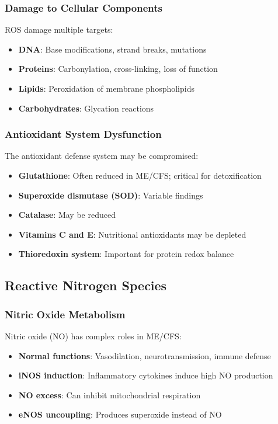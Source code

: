 \subsubsection{Damage to Cellular Components}

ROS damage multiple targets:

\begin{itemize}
    \item \textbf{DNA}: Base modifications, strand breaks, mutations
    \item \textbf{Proteins}: Carbonylation, cross-linking, loss of function
    \item \textbf{Lipids}: Peroxidation of membrane phospholipids
    \item \textbf{Carbohydrates}: Glycation reactions
\end{itemize}

\subsubsection{Antioxidant System Dysfunction}

The antioxidant defense system may be compromised:

\begin{itemize}
    \item \textbf{Glutathione}: Often reduced in ME/CFS; critical for detoxification
    \item \textbf{Superoxide dismutase (SOD)}: Variable findings
    \item \textbf{Catalase}: May be reduced
    \item \textbf{Vitamins C and E}: Nutritional antioxidants may be depleted
    \item \textbf{Thioredoxin system}: Important for protein redox balance
\end{itemize}

\subsection{Reactive Nitrogen Species}
\label{sec:rns}

\subsubsection{Nitric Oxide Metabolism}

Nitric oxide (NO) has complex roles in ME/CFS:

\begin{itemize}
    \item \textbf{Normal functions}: Vasodilation, neurotransmission, immune defense
    \item \textbf{iNOS induction}: Inflammatory cytokines induce high NO production
    \item \textbf{NO excess}: Can inhibit mitochondrial respiration
    \item \textbf{eNOS uncoupling}: Produces superoxide instead of NO
\end{itemize}

